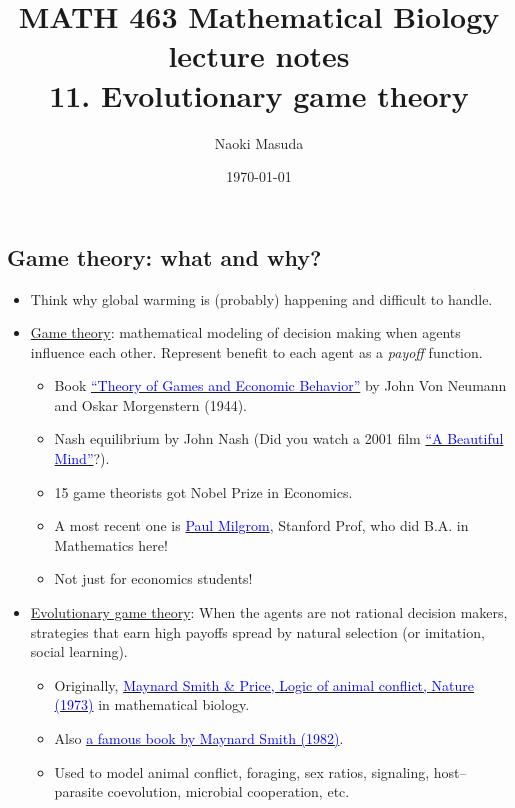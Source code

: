 \documentclass[20pt]{extarticle}
\newcommand{\hrefc}[2]{\href{#1}{\textcolor{blue}{#2}}}
\begin{document}
\title{MATH 463 Mathematical Biology\\
lecture notes\\
11. Evolutionary game theory}
\date{\today}
\author{Naoki Masuda}

\maketitle

\subsection*{Game theory: what and why?}

\begin{itemize}
%
\item Think why global warming is (probably) happening and difficult to handle.
%
\item \underline{Game theory}: mathematical modeling of decision making when agents influence each other. Represent benefit to each agent as a \emph{payoff} function.
	\begin{itemize}
	\item Book \hrefc{https://en.wikipedia.org/wiki/Theory_of_Games_and_Economic_Behavior}{``Theory of Games and Economic Behavior''} by John Von Neumann and Oskar Morgenstern (1944).
	\item Nash equilibrium by John Nash (Did you watch a 2001 film \hrefc{https://en.wikipedia.org/wiki/A_Beautiful_Mind_(film)}{``A Beautiful Mind''}?).
	\item 15 game theorists got Nobel Prize in Economics.
	\item A most recent one is \hrefc{https://en.wikipedia.org/wiki/Paul_Milgrom}{Paul Milgrom}, Stanford Prof, who did B.A. in Mathematics here!
	\item Not just for economics students!
	\end{itemize}
%
\item \underline{Evolutionary game theory}: When the agents are not rational decision makers, strategies that earn high payoffs spread by natural selection (or imitation, social learning).
	\begin{itemize}
	\item Originally, \hrefc{https://doi.org/10.1038/246015a0}{Maynard Smith \& Price, Logic of animal conflict, Nature (1973)} in mathematical biology.
	\item Also \hrefc{https://doi.org/10.1017/CBO9780511806292}{a famous book by Maynard Smith (1982)}.
	\item Used to model animal conflict, foraging, sex ratios, signaling, host--parasite coevolution, microbial cooperation, etc.
	\end{itemize}
\end{itemize}
\end{document}
